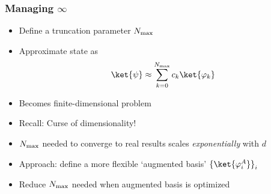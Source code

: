 \begin{frame}
    \frametitle{Managing $\infty$}
    \begin{itemize}[<+->]
        \setlength\itemsep{0.8em}
        \item Define a truncation parameter $N_{\text{max}}$
        \item Approximate state as \[\ket{\psi} \approx \sum_{k=0}^{\nmax} c_k \ket{\varphi_k}\]
        \item Becomes finite-dimensional problem
        \item Recall: Curse of dimensionality!
        \item $N_{\text{max}}$ needed to converge to real results scales \textit{exponentially} with $d$
        \item Approach: define a more flexible `augmented basis' ${\{\ket{\varphi_i^A}\}}_i$ 
        \item Reduce $N_{\text{max}}$ needed when augmented basis is optimized
    \end{itemize}
\end{frame}



